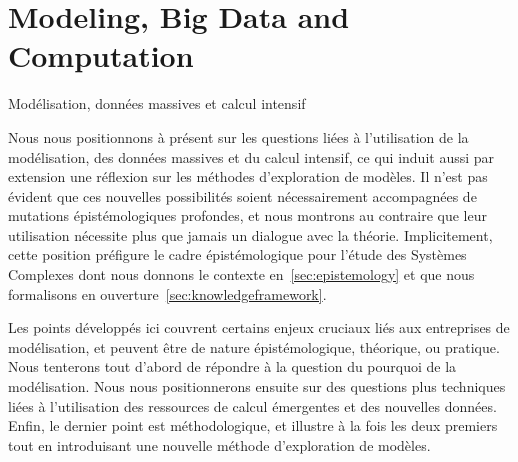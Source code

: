 





\newpage



\section{Modeling, Big Data and Computation}{Modélisation, données massives et calcul intensif}


\label{sec:computation}





Nous nous positionnons à présent sur les questions liées à l'utilisation de la modélisation, des données massives et du calcul intensif, ce qui induit aussi par extension une réflexion sur les méthodes d'exploration de modèles. Il n'est pas évident que ces nouvelles possibilités soient nécessairement accompagnées de mutations épistémologiques profondes, et nous montrons au contraire que leur utilisation nécessite plus que jamais un dialogue avec la théorie. Implicitement, cette position préfigure le cadre épistémologique pour l'étude des Systèmes Complexes dont nous donnons le contexte en~\ref{sec:epistemology} et que nous formalisons en ouverture~\ref{sec:knowledgeframework}.


Les points développés ici couvrent certains enjeux cruciaux liés aux entreprises de modélisation, et peuvent être de nature épistémologique, théorique, ou pratique. Nous tenterons tout d'abord de répondre à la question du pourquoi de la modélisation. Nous nous positionnerons ensuite sur des questions plus techniques liées à l'utilisation des ressources de calcul émergentes et des nouvelles données. Enfin, le dernier point est méthodologique, et illustre à la fois les deux premiers tout en introduisant une nouvelle méthode d'exploration de modèles.






